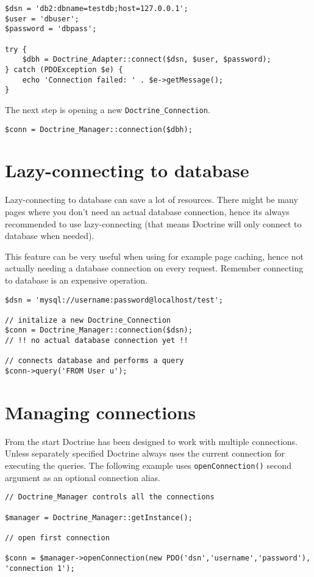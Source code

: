 \documentclass[11pt,a4paper]{report}
\begin{document}
\begin{verbatim}
$dsn = 'db2:dbname=testdb;host=127.0.0.1';
$user = 'dbuser';
$password = 'dbpass';

try {
    $dbh = Doctrine_Adapter::connect($dsn, $user, $password);
} catch (PDOException $e) {
    echo 'Connection failed: ' . $e->getMessage();
}
\end{verbatim}

The next step is opening a new \texttt{Doctrine\_Connection}.

\begin{verbatim}
$conn = Doctrine_Manager::connection($dbh);
\end{verbatim}

\section{Lazy-connecting to database}
Lazy-connecting to database can save a lot of resources. There might be many pages where you don't need an actual database connection, hence its always recommended to use lazy-connecting (that means Doctrine will only connect to database when needed).

This feature can be very useful when using for example page caching, hence not actually needing a database connection on every request. Remember connecting to database is an expensive operation.

\begin{verbatim}
$dsn = 'mysql://username:password@localhost/test';

// initalize a new Doctrine_Connection
$conn = Doctrine_Manager::connection($dsn);
// !! no actual database connection yet !!

// connects database and performs a query
$conn->query('FROM User u');
\end{verbatim}

\section{Managing connections}
From the start Doctrine has been designed to work with multiple connections. Unless separately specified Doctrine always uses the current connection for executing the queries. The following example uses \texttt{openConnection()} second argument as an optional connection alias.

\begin{verbatim}
// Doctrine_Manager controls all the connections

$manager = Doctrine_Manager::getInstance();

// open first connection

$conn = $manager->openConnection(new PDO('dsn','username','password'), 'connection 1');
\end{verbatim}
\end{document}
